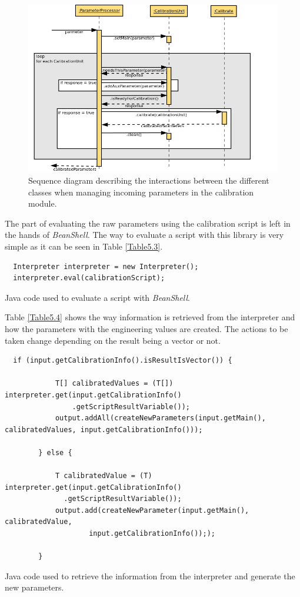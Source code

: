 \begin{figure}[H]
\centerline{\includegraphics[width=1\textwidth]{images/ReceiveParameterAndCalibrateSequence.png}}
\caption{Sequence diagram describing the interactions between the different classes when managing incoming parameters in the calibration module.}
\label{f5.6}
\end{figure}


The part of evaluating the raw parameters using the calibration script is left in the hands of \emph{BeanShell}. The way to evaluate a script with this library is very simple as it can be seen in Table \ref{Table5.3}. 


\begin{table}[h]
\lstset{language=Java}
\begin{lstlisting}
  Interpreter interpreter = new Interpreter();
  interpreter.eval(calibrationScript);
\end{lstlisting}
\caption{Java code used to evaluate a script with \emph{BeanShell}.}
\label{Table5.3}
\end{table}


Table \ref{Table5.4} shows the way information is retrieved from the interpreter and how the parameters with the engineering values are created. The actions to be taken change depending on the result being a vector or not.

\begin{table}[H]
\lstset{language=Java}
\begin{lstlisting}
  if (input.getCalibrationInfo().isResultIsVector()) {

            T[] calibratedValues = (T[]) interpreter.get(input.getCalibrationInfo()
                .getScriptResultVariable());
            output.addAll(createNewParameters(input.getMain(), calibratedValues, input.getCalibrationInfo()));

        } else {

            T calibratedValue = (T) interpreter.get(input.getCalibrationInfo()
              .getScriptResultVariable());
            output.add(createNewParameter(input.getMain(), calibratedValue,
                    input.getCalibrationInfo()););

        }
\end{lstlisting}
\caption{Java code used to retrieve the information from the interpreter and generate the new parameters.}
\label{Table5.4}
\end{table}



